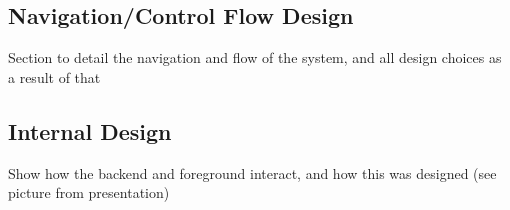 \subsection{Navigation/Control Flow Design}		
{\color{red} Section to detail the navigation and flow of the system, and all design choices as a result of that }

\subsection{Internal Design}
{\color{red} Show how the backend and foreground interact, and how this was designed (see picture from presentation) }
